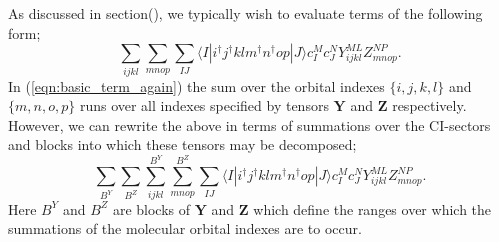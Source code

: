 \documentclass[12pt]{article}
\begin{document}
\noindent As discussed in section(), we typically wish to evaluate terms of the
following form;
\begin{equation}
\sum_{ijkl}\sum_{mnop} \sum_{IJ} \langle I | i^{\dagger}j^{\dagger}klm^{\dagger}n^{\dagger}op | J \rangle c^{M}_{I} c_{J}^{N} Y^{ML}_{ijkl}Z^{NP}_{mnop}.
\label{eqn:basic_term_again}
\end{equation}
\noindent In (\ref{eqn:basic_term_again}) the sum over the orbital indexes
$\{i,j,k,l\}$ and  $\{m,n,o,p\}$ runs over all indexes specified by tensors
$\mathbf{Y}$ and $\mathbf{Z}$ respectively. However, we can rewrite the above
in terms of summations over the CI-sectors and blocks into which these tensors may be
decomposed;
\begin{equation}
\sum_{B^{Y}}\sum_{B^{Z}}
\sum^{B^{Y}}_{ijkl}\sum^{B^{Z}}_{mnop} \sum_{IJ} \langle I | i^{\dagger}j^{\dagger}klm^{\dagger}n^{\dagger}op | J \rangle c^{M}_{I} c_{J}^{N} Y^{ML}_{ijkl}Z^{NP}_{mnop}.
\label{eqn:basic_term_block_wise}
\end{equation}
\noindent Here $B^{Y}$ and $B^{Z}$ are blocks of $\mathbf{Y}$ and $\mathbf{Z}$
which define the ranges over which the summations of the molecular orbital
indexes are to occur.\\
\end{document}
